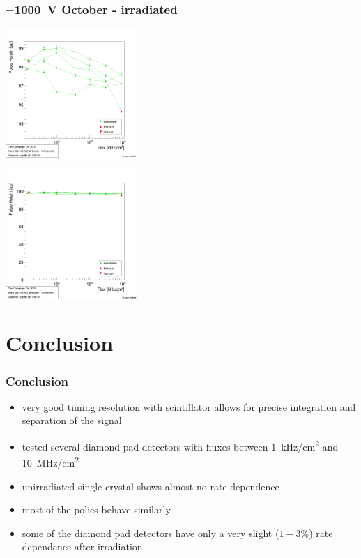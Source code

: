\documentclass[9pt]{beamer}
\begin{document}
\begin{frame}
	\frametitle{$-$\SI{1000}{V} October - irradiated}
	\begin{minipage}{5.5cm}
		\centering
		\includegraphics[width=5cm]{PH81}
	\end{minipage}
	\hspace*{2pt}
	\begin{minipage}{5.5cm}
		\centering
		\includegraphics[width=5cm]{PHZ81}
	\end{minipage}
\end{frame}
\section{Conclusion}
\begin{frame}
	\frametitle{Conclusion}
	\begin{itemize}
		\setlength{\itemsep}{\fill}
		\item very good timing resolution with scintillator allows for precise integration and separation of the signal
		\item tested several diamond pad detectors with fluxes between \SI{1}{kHz/cm^{2}} and \SI{10}{MHz/cm^{2}}
		\item unirradiated single crystal shows almost no rate dependence
		\item most of the polies behave similarly
		\item some of the diamond pad detectors have only a very slight ($1-3$\%) rate dependence after irradiation
	\end{itemize}
\end{frame}
\end{document}
